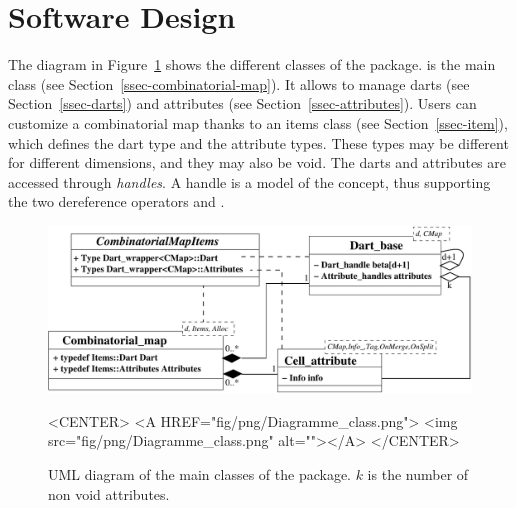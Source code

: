 \section{Software Design}\label{sec-software-design}
The diagram in Figure~\ref{fig-diagram_class} shows the different
classes of the package.   is the main class
(see Section~\ref{ssec-combinatorial-map}). It allows to manage darts
(see Section~\ref{ssec-darts}) and attributes (see
Section~\ref{ssec-attributes}).
Users can customize a combinatorial map thanks to an items class (see
Section~\ref{ssec-item}), which defines the dart type and the
attribute types. These types may be different for different
dimensions, and they may also be void.  The darts and attributes are
accessed through \emph{handles}. A handle is a model of the
 concept, thus supporting the two dereference operators
 and .

\begin{figure}
  \begin{ccTexOnly}
    \begin{center}
      \includegraphics[width=.95\textwidth]
      {Combinatorial_map/fig/pdf/Diagramme_class}
    \end{center}
  \end{ccTexOnly}
  \begin{ccHtmlOnly}
    <CENTER>
    <A HREF="fig/png/Diagramme_class.png">
        <img src="fig/png/Diagramme_class.png" alt=""></A>
    </CENTER>
    \end{ccHtmlOnly}
    \caption{UML diagram of the main classes of the package. $k$ is the number of
      non void attributes.}
    \label{fig-diagram_class}
\end{figure}



